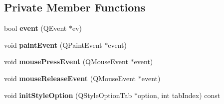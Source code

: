 \subsection*{Private Member Functions}
\begin{DoxyCompactItemize}
\item 
\hypertarget{class_tab_bar_helper_a12d594e2a22b3b9bdff5092a8a0a1498}{
bool {\bfseries event} (QEvent $\ast$ev)}
\label{class_tab_bar_helper_a12d594e2a22b3b9bdff5092a8a0a1498}

\item 
\hypertarget{class_tab_bar_helper_afc809db42e417bac55eb068e04d13144}{
void {\bfseries paintEvent} (QPaintEvent $\ast$event)}
\label{class_tab_bar_helper_afc809db42e417bac55eb068e04d13144}

\item 
\hypertarget{class_tab_bar_helper_a3eb170e7899a8dad031cefaaa1863582}{
void {\bfseries mousePressEvent} (QMouseEvent $\ast$event)}
\label{class_tab_bar_helper_a3eb170e7899a8dad031cefaaa1863582}

\item 
\hypertarget{class_tab_bar_helper_a76dcb94ae535b73a7150ce37bdcdf6db}{
void {\bfseries mouseReleaseEvent} (QMouseEvent $\ast$event)}
\label{class_tab_bar_helper_a76dcb94ae535b73a7150ce37bdcdf6db}

\item 
\hypertarget{class_tab_bar_helper_adbeb5b404ed3628e52d617cfea276d4c}{
void {\bfseries initStyleOption} (QStyleOptionTab $\ast$option, int tabIndex) const }
\label{class_tab_bar_helper_adbeb5b404ed3628e52d617cfea276d4c}

\end{DoxyCompactItemize}
